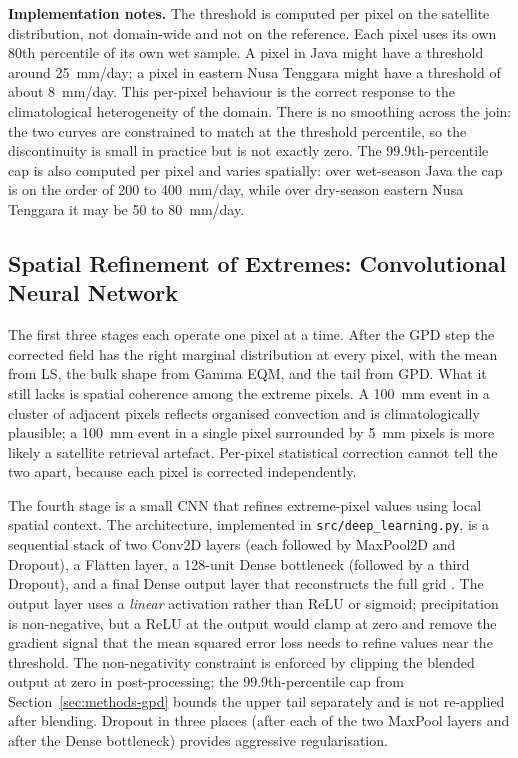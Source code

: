 \medskip\noindent\textbf{Implementation notes.}
The threshold is computed per pixel on the satellite distribution,
not domain-wide and not on the reference. Each pixel uses its
own 80th percentile of its own wet sample. A pixel in Java
might have a threshold around 25~mm/day; a pixel in eastern
Nusa Tenggara might have a threshold of about 8~mm/day. This
per-pixel behaviour is the correct response to the
climatological heterogeneity of the domain. There is no
smoothing across the join: the two curves are constrained to
match at the threshold percentile, so the discontinuity is small
in practice but is not exactly
zero. The 99.9th-percentile cap is also computed per pixel and
varies spatially: over wet-season Java the cap is on the order
of 200 to 400~mm/day, while over dry-season eastern Nusa
Tenggara it may be 50 to 80~mm/day.


\subsection{Spatial Refinement of Extremes: Convolutional Neural Network}\label{sec:methods-cnn}

The first three stages each operate one pixel at a time. After
the GPD step the corrected field has the right marginal
distribution at every pixel, with the mean from LS, the bulk
shape from Gamma EQM, and the tail from GPD. What it still lacks
is spatial coherence among the extreme pixels. A 100~mm event in
a cluster of adjacent pixels reflects organised convection and
is climatologically plausible; a 100~mm event in a single pixel
surrounded by 5~mm pixels is more likely a satellite retrieval
artefact. Per-pixel statistical correction cannot tell the two
apart, because each pixel is corrected independently.

The fourth stage is a small CNN
that refines extreme-pixel values using local spatial context.
The architecture, implemented in \texttt{src/deep\_learning.py},
is a sequential stack of two Conv2D layers (each followed by
MaxPool2D and Dropout), a Flatten layer, a 128-unit Dense
bottleneck (followed by a third Dropout), and a final Dense
output layer that reconstructs the full grid
\citep{ref:pan2019, ref:banomedina2020}. The output layer uses a
\textit{linear} activation rather than ReLU or sigmoid;
precipitation is non-negative, but a ReLU at the output would
clamp at zero and remove the gradient signal that the mean
squared error loss needs to refine values near the threshold.
The non-negativity constraint is enforced by clipping the
blended output at zero in post-processing; the
99.9th-percentile cap from Section~\ref{sec:methods-gpd} bounds
the upper tail separately and is not re-applied after blending.
Dropout in three places (after each of the two MaxPool layers
and after the Dense bottleneck) provides aggressive
regularisation.

